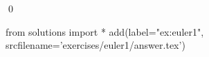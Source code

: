 
\begin{ex} 
  \label{ex:euler1}
  
  \qed
\end{ex} 
\begin{python0}
from solutions import *
add(label="ex:euler1",
    srcfilename='exercises/euler1/answer.tex') 
\end{python0}
